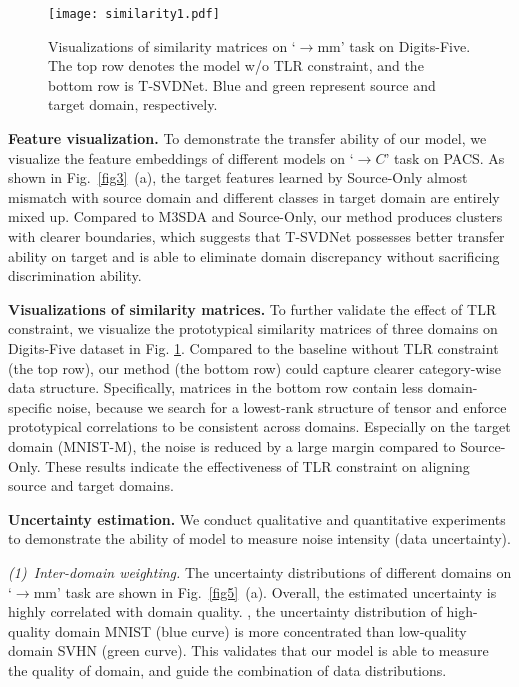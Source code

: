 \documentclass[10pt,twocolumn,letterpaper]{article}
\begin{document}
\begin{figure}
	\centering
	\texttt{[image: similarity1.pdf]}\\
	\caption{Visualizations of similarity matrices on `$\to$mm' task on Digits-Five. The top row denotes the model w/o TLR constraint, and the bottom row is T-SVDNet. Blue and green represent source and target domain, respectively.}
	\label{fig4}
	\vspace{-1em}
\end{figure}
\textbf{Feature visualization.} 
To demonstrate the transfer ability of our model, we visualize the feature embeddings of different models on `$\to C$' task on PACS. As shown in Fig.~\ref{fig3}~(a), the target features learned by Source-Only almost mismatch with source domain and different classes in target domain are entirely mixed up. Compared to M3SDA and Source-Only, our method produces clusters with clearer boundaries, which suggests that T-SVDNet possesses better transfer ability on target and is able to eliminate domain discrepancy without sacrificing discrimination ability.\par
\textbf{Visualizations of similarity matrices.} 
To further validate the effect of TLR constraint, we visualize the prototypical similarity matrices of three domains on Digits-Five dataset in Fig. \ref{fig4}. Compared to the baseline without TLR constraint (the top row), our method (the bottom row) could capture clearer category-wise data structure. Specifically, matrices in the bottom row contain less domain-specific noise, because we search for a lowest-rank structure of tensor and enforce prototypical correlations to be consistent across domains. Especially on the target domain (MNIST-M), the noise is reduced by a large margin compared to Source-Only. These results indicate the effectiveness of TLR constraint on aligning source and target domains.\par
\textbf{Uncertainty estimation.} We conduct qualitative and quantitative experiments to demonstrate the ability of model to measure noise intensity (data uncertainty).\par
\textit{(1)~Inter-domain weighting.}  The uncertainty distributions of different domains on `$\to$mm' task are shown in Fig.~\ref{fig5}~(a). Overall, the estimated uncertainty is highly correlated with domain quality. \eg, the uncertainty distribution of high-quality domain MNIST (blue curve) is more concentrated than low-quality domain SVHN (green curve). This validates that our model is able to measure the quality of domain, and guide the combination of data distributions.\par
\end{document}
